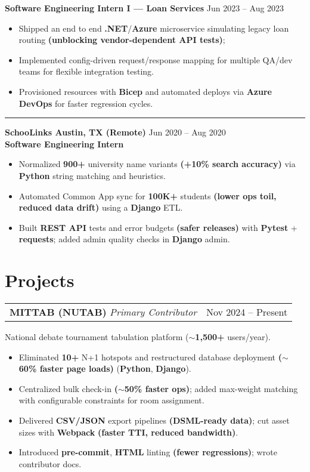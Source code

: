 \documentclass[11pt]{article}
\makeatletter
\newcommand{\EmployerSize}{11}
\newcommand{\EmployerLead}{13}
\newcommand{\EmployerWeight}{\bfseries}
\newcommand{\EmployerPreSkip}{2pt}
\newcommand{\EmployerPostSkip}{-2pt}
\newcommand{\RoleTitleSize}{11}
\newcommand{\RoleTitleLead}{13}
\newcommand{\RoleTitleWeight}{\bfseries}
\newcommand{\RoleDateSize}{10}
\newcommand{\RoleDateLead}{12}
\newcommand{\RolePreSkip}{2pt}
\newcommand{\RolePostSkip}{-8pt}
\newcommand{\BulletSize}{10}
\newcommand{\BulletLead}{12}
\newcommand{\BlurbSize}{10}
\newcommand{\BlurbLead}{12}
\newcommand{\BlurbPre}{0pt}
\newcommand{\BlurbPost}{-8pt}
\newcommand{\SepLength}{0.1\textwidth}
\newcommand{\SepThickness}{0.5pt}
\newcommand{\SepRaise}{1ex}
\newenvironment{twocol}[2]{%
  \noindent\begin{tabular*}{\textwidth}{@{\extracolsep{\fill}} l r}
  #1 & #2\\
  \end{tabular*}\ignorespaces
}{\par}
\newcommand{\EmployerHeader}[2]{%
  \vspace*{\EmployerPreSkip}%
  \noindent
  {\fontsize{\EmployerSize}{\EmployerLead}\selectfont \EmployerWeight #1}%
  \hfill
  {\fontsize{\EmployerSize}{\EmployerLead}\selectfont #2}%
  \\[\EmployerPostSkip]%
}
\newcommand{\RoleHeader}[2]{%
  \vspace*{\RolePreSkip}%
  \noindent
  {\fontsize{\RoleTitleSize}{\RoleTitleLead}\selectfont \RoleTitleWeight #1}%
  \hfill
  {\fontsize{\RoleDateSize}{\RoleDateLead}\selectfont #2}%
  \\[\RolePostSkip]%
}
\newenvironment{ResumeItemize}{%
  \begin{itemize}\fontsize{\BulletSize}{\BulletLead}\selectfont
}{%
  \end{itemize}
}
\newcommand{\ProjectBlurb}[1]{%
  \vspace*{\BlurbPre}%
  {\fontsize{\BlurbSize}{\BlurbLead}\selectfont #1}%
  \\[\BlurbPost]%
}
\newcommand*\sepline{\noindent\rule[\SepRaise]{\SepLength}{\SepThickness}\par}
\makeatother
\begin{document}
\RoleHeader{Software Engineering Intern I — Loan Services}{Jun 2023 -- Aug 2023}
\begin{ResumeItemize}
  \item Shipped an end to end \textbf{.NET}/\textbf{Azure} microservice simulating legacy loan routing \textbf{(unblocking vendor-dependent API tests)};
  \item Implemented config-driven request/response mapping for multiple QA/dev teams for flexible integration testing.
  \item Provisioned resources with \textbf{Bicep} and automated deploys via \textbf{Azure DevOps} for faster regression cycles.
\end{ResumeItemize}

\sepline

\EmployerHeader{SchooLinks \quad Austin, TX (Remote)}{Jun 2020 -- Aug 2020}
\RoleHeader{Software Engineering Intern}{}
\begin{ResumeItemize}
  \item Normalized \textbf{900+} university name variants \textbf{(+10\% search accuracy)} via \textbf{Python} string matching and heuristics.
  \item Automated Common App sync for \textbf{100K+} students \textbf{(lower ops toil, reduced data drift)} using a \textbf{Django} ETL.
  \item Built \textbf{REST API} tests and error budgets \textbf{(safer releases)} with \textbf{Pytest} + \textbf{requests}; added admin quality checks in \textbf{Django} admin.
\end{ResumeItemize}

\section{Projects}

\begin{twocol}{\textbf{MIT\textendash TAB (NU\textendash TAB)} \;\textit{Primary Contributor}}{Nov 2024 -- Present}\end{twocol}
\ProjectBlurb{National debate tournament tabulation platform (\(\sim\)\textbf{1{,}500+} users/year).}
\begin{ResumeItemize}
  \item Eliminated \textbf{10+} N+1 hotspots and restructured database deployment \textbf{(\(\sim\)60\% faster page loads)} (\textbf{Python}, \textbf{Django}).
  \item Centralized bulk check-in \textbf{(\(\sim\)50\% faster ops)}; added max-weight matching with configurable constraints for room assignment.
  \item Delivered \textbf{CSV/JSON} export pipelines \textbf{(DSML-ready data)}; cut asset sizes with \textbf{Webpack} \textbf{(faster TTI, reduced bandwidth)}.
  \item Introduced \textbf{pre-commit}, \textbf{HTML} linting \textbf{(fewer regressions)}; wrote contributor docs.
\end{ResumeItemize}
\end{document}
